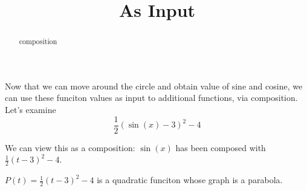 \documentclass{ximera}
\title{As Input}
\begin{document}
\begin{abstract}
composition
\end{abstract}
\maketitle




Now that we can move around the circle and obtain value of sine and cosine, we can use these funciton values as input to additional functions, via composition. \\




Let's examine 
\[ \frac{1}{2} (\sin(x) - 3)^2 - 4 \]


We can view this as a composition: $\sin(x)$ has been composed with $\frac{1}{2} (t - 3)^2 - 4$.



$P(t) = \frac{1}{2} (t - 3)^2 - 4$ is a quadratic funciton whose graph is a parabola.




\begin{image}
\end{image}
\end{document}
